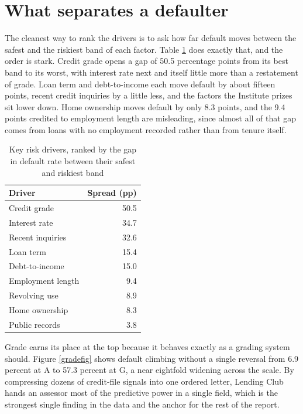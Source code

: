 \documentclass[11pt,preprint]{elsarticle}
\numberwithin{equation}{section}
\numberwithin{figure}{section}
\numberwithin{table}{section}
\begin{document}
\section*{What separates a defaulter}\label{what-separates-a-defaulter}

The cleanest way to rank the drivers is to ask how far default moves
between the safest and the riskiest band of each factor. Table
\ref{drivertab} does exactly that, and the order is stark. Credit grade
opens a gap of 50.5 percentage points from its best band to its worst,
with interest rate next and itself little more than a restatement of
grade. Loan term and debt-to-income each move default by about fifteen
points, recent credit inquiries by a little less, and the factors the
Institute prizes sit lower down. Home ownership moves default by only
8.3 points, and the 9.4 points credited to employment length are
misleading, since almost all of that gap comes from loans with no
employment recorded rather than from tenure itself.

\begin{longtable}[t]{lr}
\caption{\label{tab:drivertab}\label{drivertab}Key risk drivers, ranked by the gap in default rate between their safest and riskiest band}\\
\toprule
Driver & Spread (pp)\\
\midrule
Credit grade & 50.5\\
Interest rate & 34.7\\
Recent inquiries & 32.6\\
Loan term & 15.4\\
Debt-to-income & 15.0\\
\addlinespace
Employment length & 9.4\\
Revolving use & 8.9\\
Home ownership & 8.3\\
Public records & 3.8\\
\bottomrule
\end{longtable}

Grade earns its place at the top because it behaves exactly as a grading
system should. Figure \ref{gradefig} shows default climbing without a
single reversal from 6.9 percent at A to 57.3 percent at G, a near
eightfold widening across the scale. By compressing dozens of
credit-file signals into one ordered letter, Lending Club hands an
assessor most of the predictive power in a single field, which is the
strongest single finding in the data and the anchor for the rest of the
report.
\end{document}
